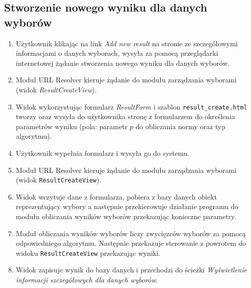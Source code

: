 \documentclass[pdflatex,11pt]{../aghdoc_version2}
\newcommand{\code}[1]{\texttt{#1}}
\begin{document}
\subsection{Stworzenie nowego wyniku dla danych wyborów}
\begin{enumerate}
\item Użytkownik klikając na link \textit{Add new result} na stronie ze szczegółowymi informacjami
o danych wyborach, wysyła za pomocą przeglądarki internetowej żądanie stworzenia
nowego wyniku dla danych wyborów.
\item Moduł URL Resolver kieruje żądanie do modułu zarządzania wyborami (widok
\textit{ResultCreateView}).
\item Widok wykorzystując formularz \textit{ResultForm} i szablon \code{result\_create.html} tworzy oraz
wysyła do użytkownika stronę z formularzem do określenia parametrów wyniku (pola:
parametr $p$ do obliczania normy oraz typ algorytmu).
\item Użytkownik wypełnia formularz i wysyła go do systemu.
\item Moduł URL Resolver kieruje żądanie do modułu zarządzania wyborami (widok
\code{ResultCreateView}).
\item Widok wczytuje dane z formularza, pobiera z bazy danych obiekt reprezentujący
wybory a następnie przekierowuje działanie programu do modułu obliczania wyników
wyborów przekazując konieczne parametry.
\item Moduł obliczania wyników wyborów liczy zwycięzców wyborów za pomocą
odpowiedniego algorytmu. Następnie przekazuje sterowanie z powrotem do widoku
\code{ResultCreateView} przekazując wyniki.
\item Widok zapisuje wynik do bazy danych i przechodzi do ścieżki \textit{Wyświetlenie
informacji szczegółowych dla danych wyborów}.
\end{enumerate}
\end{document}
